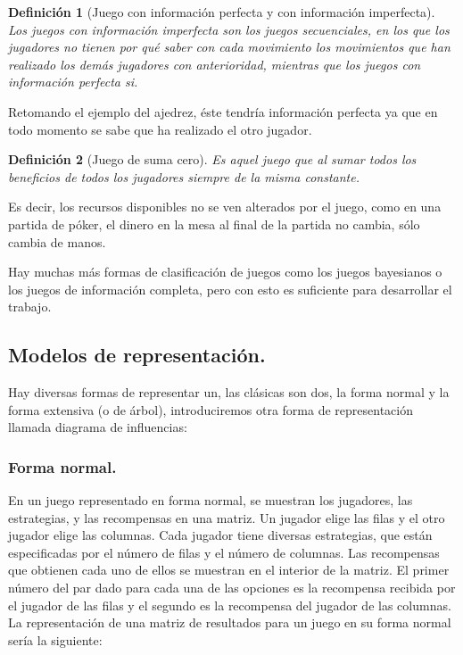 \documentclass[a4paper]{report} %
\newtheorem{definicion}{Definición}[section]
\begin{document}
\begin{definicion}[Juego con información perfecta y con información imperfecta]
Los juegos con información imperfecta son los juegos secuenciales, en los que los jugadores no tienen por qué saber  con cada movimiento los movimientos que han realizado los demás jugadores con anterioridad, mientras que los juegos con información perfecta si.
\end{definicion}

Retomando el ejemplo del ajedrez, éste tendría información perfecta ya que en todo momento se sabe que ha realizado el otro jugador.

\begin{definicion}[Juego de suma cero]
Es aquel juego que al sumar todos los beneficios de todos los jugadores siempre de la misma constante.
\end{definicion}

Es decir, los recursos disponibles no se ven alterados por el juego, como en una partida de póker, el dinero en la mesa al final de la partida no cambia, sólo cambia de manos.

Hay muchas más formas de clasificación de juegos como los juegos bayesianos o los juegos de información completa, pero con esto es suficiente para desarrollar el trabajo.

\subsection{Modelos de representación.}

Hay diversas formas de representar un, las clásicas son dos, la forma normal y la forma extensiva (o de árbol), introduciremos otra forma de representación llamada diagrama de influencias:

\subsubsection{Forma normal.}


En un juego representado en forma normal, se muestran los jugadores, las estrategias, y las recompensas en una matriz. Un jugador elige las filas y el otro jugador elige las columnas. Cada jugador tiene diversas estrategias, que están especificadas por el número de filas y el número de columnas. Las recompensas que obtienen cada uno de ellos se muestran en el interior de la matriz. El primer número del par dado para cada una de las opciones es la recompensa recibida por el jugador de las filas y el segundo es la recompensa del jugador de las columnas. La representación de una matriz de resultados para un juego en su forma normal sería la siguiente: 
\end{document}
